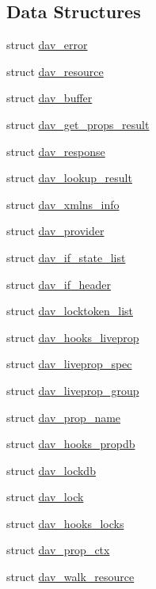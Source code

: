 \subsection*{Data Structures}
\begin{DoxyCompactItemize}
\item 
struct \hyperlink{structdav__error}{dav\+\_\+error}
\item 
struct \hyperlink{structdav__resource}{dav\+\_\+resource}
\item 
struct \hyperlink{structdav__buffer}{dav\+\_\+buffer}
\item 
struct \hyperlink{structdav__get__props__result}{dav\+\_\+get\+\_\+props\+\_\+result}
\item 
struct \hyperlink{structdav__response}{dav\+\_\+response}
\item 
struct \hyperlink{structdav__lookup__result}{dav\+\_\+lookup\+\_\+result}
\item 
struct \hyperlink{structdav__xmlns__info}{dav\+\_\+xmlns\+\_\+info}
\item 
struct \hyperlink{structdav__provider}{dav\+\_\+provider}
\item 
struct \hyperlink{structdav__if__state__list}{dav\+\_\+if\+\_\+state\+\_\+list}
\item 
struct \hyperlink{structdav__if__header}{dav\+\_\+if\+\_\+header}
\item 
struct \hyperlink{structdav__locktoken__list}{dav\+\_\+locktoken\+\_\+list}
\item 
struct \hyperlink{structdav__hooks__liveprop}{dav\+\_\+hooks\+\_\+liveprop}
\item 
struct \hyperlink{structdav__liveprop__spec}{dav\+\_\+liveprop\+\_\+spec}
\item 
struct \hyperlink{structdav__liveprop__group}{dav\+\_\+liveprop\+\_\+group}
\item 
struct \hyperlink{structdav__prop__name}{dav\+\_\+prop\+\_\+name}
\item 
struct \hyperlink{structdav__hooks__propdb}{dav\+\_\+hooks\+\_\+propdb}
\item 
struct \hyperlink{structdav__lockdb}{dav\+\_\+lockdb}
\item 
struct \hyperlink{structdav__lock}{dav\+\_\+lock}
\item 
struct \hyperlink{structdav__hooks__locks}{dav\+\_\+hooks\+\_\+locks}
\item 
struct \hyperlink{structdav__prop__ctx}{dav\+\_\+prop\+\_\+ctx}
\item 
struct \hyperlink{structdav__walk__resource}{dav\+\_\+walk\+\_\+resource}

\end{DoxyCompactItemize}
